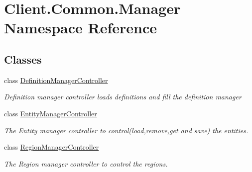 \hypertarget{namespaceClient_1_1Common_1_1Manager}{}\section{Client.\+Common.\+Manager Namespace Reference}
\label{namespaceClient_1_1Common_1_1Manager}
\subsection*{Classes}
\begin{DoxyCompactItemize}
\item 
class \hyperlink{classClient_1_1Common_1_1Manager_1_1DefinitionManagerController}{Definition\+Manager\+Controller}
\begin{DoxyCompactList}\small\item\em Definition manager controller loads definitions and fill the definition manager \end{DoxyCompactList}\item 
class \hyperlink{classClient_1_1Common_1_1Manager_1_1EntityManagerController}{Entity\+Manager\+Controller}
\begin{DoxyCompactList}\small\item\em The Entity manager controller to control(load,remove,get and save) the entities. \end{DoxyCompactList}\item 
class \hyperlink{classClient_1_1Common_1_1Manager_1_1RegionManagerController}{Region\+Manager\+Controller}
\begin{DoxyCompactList}\small\item\em The Region manager controller to control the regions. \end{DoxyCompactList}\end{DoxyCompactItemize}
